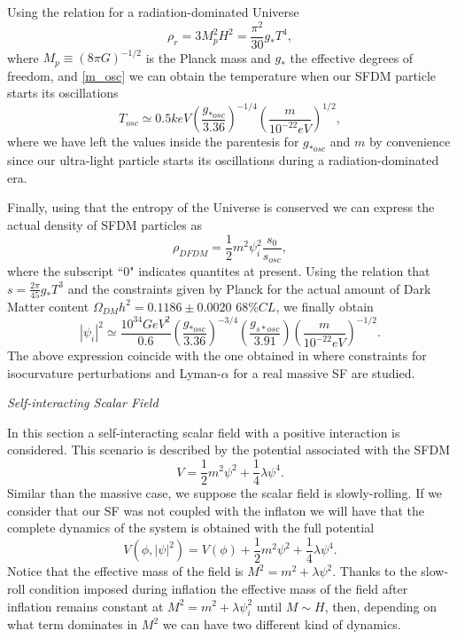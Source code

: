 \documentclass[amssymb,twocolumn,prd,nofootinbib,showpacs]{revtex4-1}
\begin{document}
Using the relation for a radiation-dominated Universe
\begin{equation}
\rho_r = 3M_p^2H^2=\frac{\pi^2}{30}g_*T^4,
\end{equation}
where $M_p\equiv (8\pi G)^{-1/2}$ is the Planck mass and $g_*$ the effective degrees of freedom, and \eqref{m_osc} we can obtain the temperature when our SFDM particle starts its oscillations
\begin{equation}
T_{osc}\simeq 0.5 keV\left(\frac{g_{*osc}}{3.36}\right)^{-1/4}\left(\frac{m}{10^{-22}eV}\right)^{1/2},
\end{equation}
where we have left the values inside the parentesis for $g_{*osc}$ and $m$ by convenience since our ultra-light particle starts its oscillations during a radiation-dominated era. 

Finally, using that the entropy of the Universe is conserved we can express the actual density of SFDM particles as
\begin{equation}
\rho_{DFDM}=\frac{1}{2}m^2\psi_i^2\frac{s_0}{s_{osc}},
\end{equation}
where the subscript ``$0$" indicates quantites at present. Using the relation that $s=\frac{2\pi}{45}g_{*}T^3$ and the constraints given by Planck \cite{Planckcolaboration} for the actual amount of Dark Matter content $\Omega_{DM}h^2=0.1186\pm 0.0020$ $68\% CL$, we finally obtain 
\begin{equation}\label{phi_im2}
|\psi_i|^2\simeq\frac{10^{34}GeV^2}{0.6}\left(\frac{g_{*osc}}{3.36}\right)^{-3/4}\left(\frac{g_{s*osc}}{3.91}\right)\left(\frac{m}{10^{-22}eV}\right)^{-1/2}.
\end{equation}
The above expression coincide with the one obtained in \cite{SFrev2} where constraints for isocurvature perturbations and Lyman-$\alpha$ for a real massive SF are studied.
\begin{center}
\textit{Self-interacting Scalar Field}
\end{center}

In this section a self-interacting scalar field with a positive interaction is considered. This scenario is described by the potential associated with the SFDM
\begin{equation}
V = \frac{1}{2}m^2\psi^2+\frac{1}{4}\lambda \psi^4.
\end{equation}
Similar than the massive case, we suppose the scalar field is slowly-rolling. If we consider that our SF was not coupled with the inflaton we will have that the complete dynamics of the system is obtained with the full potential 
\begin{equation}
V(\phi,|\psi|^2)=V(\phi)+\frac{1}{2}m^2\psi^2+\frac{1}{4}\lambda\psi^4.
\end{equation}
Notice that the effective mass of the field is $M^2=m^2+\lambda\psi^2$. Thanks to the slow-roll condition imposed during inflation the effective mass of the field after inflation remains constant at $M^2=m^2+\lambda\psi_i^2$ until $M\sim H$, then, depending on what term dominates in $M^2$ we can have two different kind of dynamics. 
\\
\end{document}
